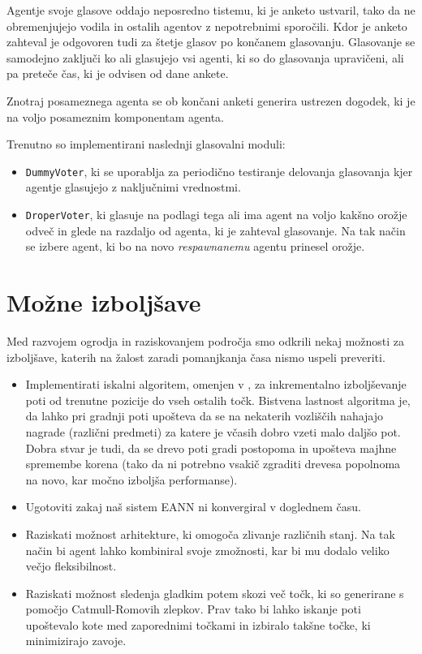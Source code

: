 \documentclass[a4paper,10pt]{article}
\begin{document}
Agentje svoje glasove oddajo neposredno tistemu, ki je anketo ustvaril, tako da ne obremenjujejo vodila in ostalih agentov z nepotrebnimi sporočili. Kdor je anketo zahteval je odgovoren tudi za štetje glasov po končanem glasovanju. Glasovanje se samodejno zaključi ko ali glasujejo vsi agenti, ki so do glasovanja upravičeni, ali pa preteče čas, ki je odvisen od dane ankete.

Znotraj posameznega agenta se ob končani anketi generira ustrezen dogodek, ki je na voljo posameznim komponentam agenta.

Trenutno so implementirani naslednji glasovalni moduli:
\begin{itemize}
  \item \texttt{DummyVoter}, ki se uporablja za periodično testiranje delovanja glasovanja kjer agentje glasujejo z naključnimi vrednostmi.
  
  \item \texttt{DroperVoter}, ki glasuje na podlagi tega ali ima agent na voljo kakšno orožje odveč in glede na razdaljo od agenta, ki je zahteval glasovanje. Na tak način se izbere agent, ki bo na novo \textit{respawnanemu} agentu prinesel orožje.
\end{itemize} 

\section{Možne izboljšave}

Med razvojem ogrodja in raziskovanjem področja smo odkrili nekaj možnosti za izboljšave, katerih na žalost zaradi pomanjkanja časa nismo uspeli preveriti.

\begin{itemize}
  \item Implementirati iskalni algoritem, omenjen v \cite{champandard02}, za inkrementalno izboljševanje poti od trenutne pozicije do vseh ostalih točk. Bistvena lastnost algoritma je, da lahko pri gradnji poti upošteva da se na nekaterih vozliščih nahajajo nagrade (različni predmeti) za katere je včasih dobro vzeti malo daljšo pot. Dobra stvar je tudi, da se drevo poti gradi postopoma in upošteva majhne spremembe korena (tako da ni potrebno vsakič zgraditi drevesa popolnoma na novo, kar močno izboljša performanse).
  
  \item Ugotoviti zakaj naš sistem EANN ni konvergiral v doglednem času.
  
  \item Raziskati možnost arhitekture, ki omogoča zlivanje različnih stanj. Na tak način bi agent lahko kombiniral svoje zmožnosti, kar bi mu dodalo veliko večjo fleksibilnost.
  
  \item Raziskati možnost sledenja gladkim potem skozi več točk, ki so generirane s pomočjo Catmull-Romovih zlepkov. Prav tako bi lahko iskanje poti upoštevalo kote med zaporednimi točkami in izbiralo takšne točke, ki minimizirajo zavoje.
\end{itemize}
\end{document}
